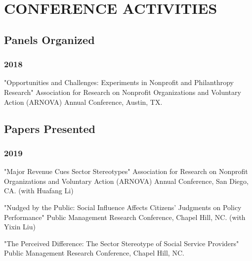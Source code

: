 \documentclass[letterpaper]{article}
\renewenvironment{itemize}{
  \begin{list}{}{
    \setlength{\leftmargin}{1.5em}
  }
}{
  \end{list}
}
\begin{document}
\bigskip

\section*{CONFERENCE ACTIVITIES}
\subsection*{Panels Organized}
\subsubsection*{2018}
\begin{itemize}
\item "Opportunities and Challenges: Experiments in Nonprofit and Philanthropy Research" Association for Research on Nonprofit Organizations and Voluntary Action (ARNOVA) Annual Conference, Austin, TX.
\end{itemize}

\subsection*{Papers Presented}
\subsubsection*{2019}
\begin{itemize}

\item "Major Revenue Cues Sector Stereotypes" Association for Research on Nonprofit Organizations and Voluntary Action (ARNOVA) Annual Conference, San Diego, CA. (with Huafang Li)

\item "Nudged by the Public: Social Influence Affects Citizens' Judgments on Policy Performance" Public Management Research Conference, Chapel Hill, NC. (with Yixin Liu)

\item "The Perceived Difference: The Sector Stereotype of Social Service Providers" Public Management Research Conference, Chapel Hill, NC.

\end{itemize}
\end{document}
